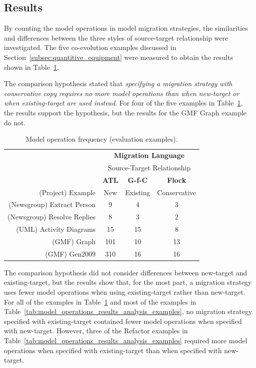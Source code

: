 \subsection{Results}
\label{subsec:quantitive_results}
By counting the model operations in model migration strategies, the similarities and differences between the three styles of source-target relationship were investigated. The five co-evolution examples discussed in Section~\ref{subsec:quantitive_equipment} were measured to obtain the results shown in Table~\ref{tab:model_operations_results}.

The comparison hypothesis stated that \emph{specifying a migration strategy with conservative copy requires no more model operations than when new-target or when existing-target are used instead}. For four of the five examples in Table~\ref{tab:model_operations_results}, the results support the hypothesis, but the results for the GMF Graph example do not.

\begin{table}
	\centering
	\begin{tabular}{|r|c|c|c|}
		\hline
		                              & \multicolumn{3}{|c|}{\textbf{Migration Language}} \\
													  			& \multicolumn{3}{|c|}{Source-Target Relationship} \\
		\hline
		                              & \textbf{ATL} & \textbf{G-f-C} & \textbf{Flock} \\
		(Project) Example             & New & Existing & Conservative \\
		\hline
		\hline
		(Newsgroup) Extract Person    & 9  &  4  &  3  \\
		\hline                       
		(Newsgroup) Resolve Replies   &  8  &  3  &  2  \\
		\hline                       
		(UML) Activity Diagrams       &  15  &  15  &  8  \\
		\hline                       
		(GMF) Graph                   &  101  &  10  &  13  \\
		\hline                       
		(GMF) Gen2009                 &  310  &  16  &  16  \\
		\hline
	\end{tabular}
	\caption{Model operation frequency (evaluation examples).}
	\label{tab:model_operations_results}
\end{table}

The comparison hypothesis did not consider differences between new-target and existing-target, but the results show that, for the most part, a migration strategy uses fewer model operations when using existing-target rather than new-target. For all of the examples in Table~\ref{tab:model_operations_results} and most of the examples in Table~\ref{tab:model_operations_results_analysis_examples}, no migration strategy specified with existing-target contained fewer model operations when specified with new-target. However, three of the Refactor examples in Table~\ref{tab:model_operations_results_analysis_examples} required more model operations when specified with existing-target than when specified with new-target.

